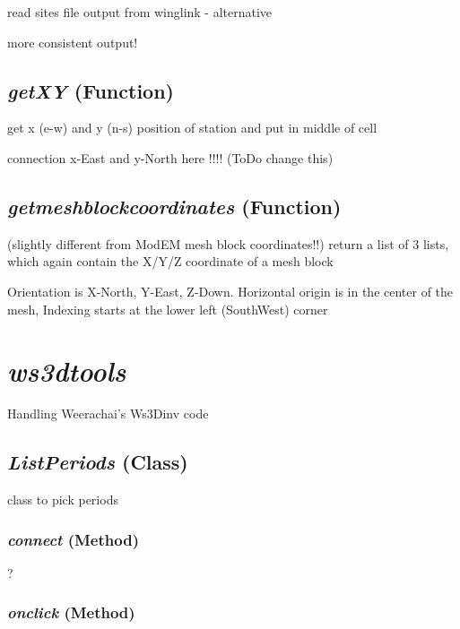 read sites file output from winglink - alternative

more consistent output!

\subsection{\textit{getXY} (Function)}
\label{ssec:.modeling.winglinktools.getXY}

get x (e-w) and y (n-s) position of station and put in middle of cell

connection x-East and y-North here !!!! (ToDo change this)

\subsection{\textit{getmeshblockcoordinates} (Function)}
\label{ssec:.modeling.winglinktools.getmeshblockcoordinates}

(slightly different from ModEM mesh block coordinates!!)
return a list of 3 lists, which again contain the X/Y/Z coordinate of a mesh block

    Orientation is X-North, Y-East, Z-Down.
    Horizontal origin is in the center of the mesh,
    Indexing starts at the lower left (SouthWest) corner



\section{\textit{ws3dtools} }
\label{sec:modeling.ws3dtools}

Handling Weerachai's Ws3Dinv code


\subsection{\textit{ListPeriods} (Class)}
\label{ssec:modeling.ws3dtools.ListPeriods}

class to pick periods

\subsubsection{\textit{connect} (Method)}
\label{sssec:modeling.ws3dtools.ListPeriods.connect}

?

\subsubsection{\textit{onclick} (Method)}
\label{sssec:modeling.ws3dtools.ListPeriods.onclick}

